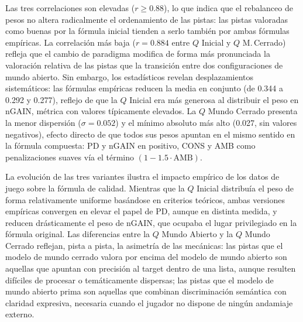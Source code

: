 \documentclass[../main.tex]{subfiles}
\begin{document}
Las tres correlaciones son elevadas ($r \geq 0.88$), lo que indica que el rebalanceo de pesos no altera radicalmente el ordenamiento de las pistas: las pistas valoradas como buenas por la fórmula inicial tienden a serlo también por ambas fórmulas empíricas. La correlación más baja ($r = 0.884$ entre $Q$ Inicial y $Q$ M.\,Cerrado) refleja que el cambio de paradigma modifica de forma más pronunciada la valoración relativa de las pistas que la transición entre dos configuraciones de mundo abierto. Sin embargo, los estadísticos revelan desplazamientos sistemáticos: las fórmulas empíricas reducen la media en conjunto (de 0.344 a 0.292 y 0.277), reflejo de que la $Q$ Inicial era más generosa al distribuir el peso en nGAIN, métrica con valores típicamente elevados. La $Q$ Mundo Cerrado presenta la menor dispersión ($\sigma = 0.052$) y el mínimo absoluto más alto (0.027, sin valores negativos), efecto directo de que todos sus pesos apuntan en el mismo sentido en la fórmula compuesta: PD y nGAIN en positivo, CONS y AMB como penalizaciones suaves vía el término $(1-1.5 \cdot \text{AMB})$.

La evolución de las tres variantes ilustra el impacto empírico de los datos de juego sobre la fórmula de calidad. Mientras que la $Q$ Inicial distribuía el peso de forma relativamente uniforme basándose en criterios teóricos, ambas versiones empíricas convergen en elevar el papel de PD, aunque en distinta medida, y reducen drásticamente el peso de nGAIN, que ocupaba el lugar privilegiado en la fórmula original. Las diferencias entre la $Q$ Mundo Abierto y la $Q$ Mundo Cerrado reflejan, pista a pista, la asimetría de las mecánicas: las pistas que el modelo de mundo cerrado valora por encima del modelo de mundo abierto son aquellas que apuntan con precisión al target dentro de una lista, aunque resulten difíciles de procesar o temáticamente dispersas; las pistas que el modelo de mundo abierto prima son aquellas que combinan discriminación semántica con claridad expresiva, necesaria cuando el jugador no dispone de ningún andamiaje externo.
\end{document}
